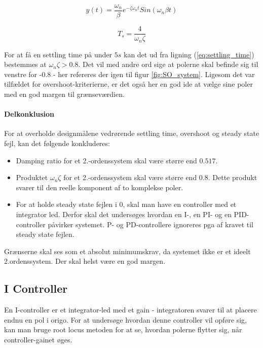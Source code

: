 \begin{equation}\label{eq:impulse_response}
y(t)=\frac{\omega_{n}}{\beta}e^{-\zeta\omega_{n}t}Sin(\omega_{n}\beta t)
\end{equation}

\begin{equation}\label{eq:settling_time}
T_{s}=\frac{4}{\omega_{n}\zeta}
\end{equation}

For at få en settling time på under $5s$ kan det ud fra ligning (\ref{eq:settling_time}) bestemmes at $\omega_{n}\zeta > 0.8$. Det vil med andre ord sige at polerne skal befinde sig til venstre for -0.8 - her refereres der igen til figur \ref{fig:SO_system}. Ligesom det var tilfældet for overshoot-kriterierne, er det også her en god ide at vælge sine poler med en god margen til grænseværdien.

\paragraph{Delkonklusion}

For at overholde designmålene vedrørende settling time, overshoot og steady state fejl, kan det følgende konkluderes:

\begin{itemize}
\item Damping ratio for et 2.-ordenssystem skal være større end $0.517$.
\item Produktet $\omega_{n}\zeta$ for et 2.-ordenssystem skal være større end $0.8$. Dette produkt svarer til den reelle komponent af to komplekse poler.
\item For at holde steady state fejlen i 0, skal man have en controller med et integrator led. Derfor skal det undersøges hvordan en I-, en PI- og en PID-controller påvirker systemet. P- og PD-controllere ignoreres pga af kravet til steady state fejlen.
\end{itemize}

Grænserne skal ses som et absolut minimumskrav, da systemet ikke er et ideelt 2.ordenssystem. Der skal helst være en god margen.

\subsection{I Controller}

En I-controller er et integrator-led med et gain - integratoren svarer til at placere endnu en pol i origo. For at undersøge hvordan denne controller vil opføre sig, kan man bruge root locus metoden for at se, hvordan polerne flytter sig, når controller-gainet øges. 

